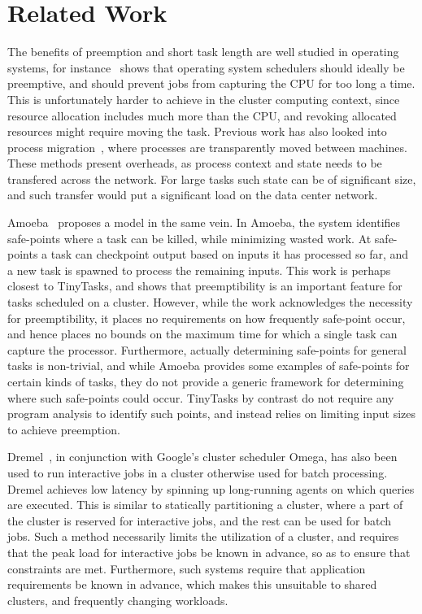 \section{Related Work}
The benefits of preemption and short task length are well studied in operating
systems, for instance~\cite{sherman1972trace} shows that operating system
schedulers should ideally be preemptive, and should prevent jobs from capturing
the CPU for too long a time. This is unfortunately harder to achieve in the
cluster computing context, since resource allocation includes much more than the
CPU, and revoking allocated resources might require moving the task. Previous
work has also looked into process
migration~\cite{douglis1991transparent,milojivcic2000process}, where processes
are transparently moved between machines. These methods present overheads, as
process context and state needs to be transfered across the network. For large
tasks such state can be of significant size, and such transfer would put a
significant load on the data center network. 

Amoeba~\cite{ananthanarayanan2012true} proposes a model in the same vein. In
Amoeba, the system identifies safe-points where a task can be killed, while
minimizing wasted work. At safe-points a task can checkpoint output based on
inputs it has processed so far, and a new task is spawned to process the
remaining inputs. This work is perhaps closest to TinyTasks, and shows that
preemptibility is an important feature for tasks scheduled on a cluster.
However, while the work acknowledges the necessity for preemptibility, it places
no requirements on how frequently safe-point occur, and hence places no bounds
on the maximum time for which a single task can capture the processor.
Furthermore, actually determining safe-points for general tasks is non-trivial,
and while Amoeba provides some examples of safe-points for certain kinds of
tasks, they do not provide a generic framework for determining where such
safe-points could occur.  TinyTasks by contrast do not require any program
analysis to identify such points, and instead relies on limiting input sizes to
achieve preemption.

Dremel~\cite{melnik2010dremel}, in conjunction with Google's cluster scheduler
Omega, has also been used to run interactive jobs in a cluster otherwise used
for batch processing. Dremel achieves low latency by spinning up long-running
agents on which queries are executed. This is similar to statically partitioning
a cluster, where a part of the cluster is reserved for interactive jobs, and the
rest can be used for batch jobs. Such a method necessarily limits the
utilization of a cluster, and requires that the peak load for interactive jobs
be known in advance, so as to ensure that constraints are met. Furthermore, such
systems require that application requirements be known in advance, which makes
this unsuitable to shared clusters, and frequently changing workloads.

